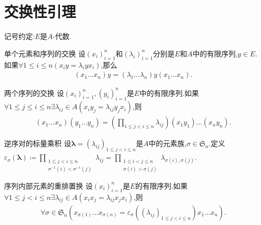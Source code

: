 \section{交换性引理}

记号约定:$E$是$A$-代数.

\begin{lemma}{单个元素和序列的交换}{}
	设$\left(x_{i}\right)_{i=1}^{n}$和$\left(\lambda_{i}\right)_{i=1}^{n}$分别是$E$和$A$中的有限序列,$y\in E$.如果$\forall 1\leq i\leq n\left(x_{i}y=\lambda_{i}yx_{i}\right)$,那么
	\begin{align*}
		\left(x_{1}\ldots x_{n}\right)y=\left(\lambda_{1}\ldots\lambda_{n}\right)y\left(x_{1}\ldots x_{n}\right).
	\end{align*}
\end{lemma}

\begin{lemma}{两个序列的交换}{}
	设$\left(x_{i}\right)_{i=1}^{n},\left(y_{i}\right)_{i=1}^{n}$是$E$中的有限序列.如果$\forall 1\leq j\leq i\leq n\exists\lambda_{ij}\in A\left(x_{i}y_{j}=\lambda_{ij}y_{j}x_{i}\right)$,则
	\begin{align*}
		\left(x_{1}\ldots x_{n}\right)\left(y_{1}\ldots y_{n}\right)=\left(\prod\limits_{1\leq j<i\leq n}\lambda_{ij}\right)\left(x_{1}y_{1}\right)\ldots\left(x_{n}y_{n}\right).
	\end{align*}
\end{lemma}

\begin{definition}{逆序对的标量乘积}{}
	设$\boldsymbol{\lambda}=\left(\lambda_{ij}\right)_{1\leq j<i\leq n}$是$A$中的元素族,$\sigma\in\mathfrak{S}_{n}$.定义$\varepsilon_{\sigma}\left(\boldsymbol{\lambda}\right)\coloneq\prod\limits_{\substack{1\leq j<i\leq n\\ \sigma^{-1}\left(i\right)<\sigma^{-1}\left(j\right)}}\lambda_{ij}=\prod\limits_{\substack{1\leq i<j\leq n\\ \sigma\left(i\right)>\sigma\left(j\right)}}\lambda_{\sigma\left(i\right),\sigma\left(j\right)}$.
\end{definition}

\begin{lemma}{序列内部元素的重排置换}{}
	设$\left(x_{i}\right)_{i=1}^{n}$是$E$的有限序列.如果$\forall 1\leq j<i\leq n\exists\lambda_{ij}\in A\left(x_{i}x_{j}=\lambda_{ij}x_{j}x_{i}\right)$,则
	\begin{align*}
		\forall\sigma\in\mathfrak{S}_{n}\left(x_{\sigma\left(1\right)}\ldots x_{\sigma\left(n\right)}=\varepsilon_{\sigma}\left(\left(\lambda_{ij}\right)_{1\leq j<i\leq n}\right)x_{1}\ldots x_{n}\right).
	\end{align*}
\end{lemma}























